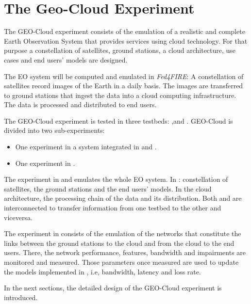 
\chapter{The Geo-Cloud Experiment}

The GEO-Cloud experiment consists of the emulation of a realistic and complete Earth Observation System that provides services using cloud technology. For that purpose a constellation of satellites, ground stations, a cloud architecture, use cases and end users' models are designed.

The \ac{EO} system will be computed and emulated in \emph{Fed4FIRE}: A constellation of satellites record images of the Earth in a daily basis. The images are transferred to ground stations that ingest the data into a cloud computing infrastructure. The data is processed and distributed to end users.

The GEO-Cloud experiment is tested in three testbeds: \vw,\bonfire and
\pl. GEO-Cloud is divided into two sub-experiments:
\begin{itemize}
\item One experiment in a system integrated in \vw and \bonfire.
\item One experiment in \pl.
\end{itemize}

The experiment in \vw and \bonfire emulates the whole \ac{EO} system. In \vw:
constellation of satellites, the ground stations and the end users' models. In
\bonfire the cloud architecture, the processing chain of the data and its
distribution. Both \vw and \bonfire are interconnected to transfer information from one testbed to the other and viceversa.

The experiment in \pl consists of the emulation of the networks that constitute
the links between the ground stations to the cloud and from the cloud to the end
users. There, the network performance, features, bandwidth and impairments are
monitored and measured. Those parameters once measured are used to update the
models implemented in \vw, i.e, bandwidth, latency and loss rate.

In the next sections, the detailed design of the GEO-Cloud experiment is introduced.






